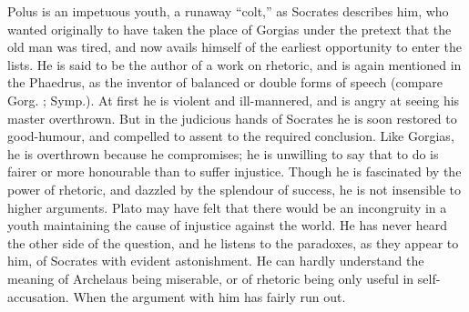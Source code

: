\documentclass[11pt,letter]{article}
\begin{document}
\par  Polus is an impetuous youth, a runaway “colt,” as Socrates describes him, who wanted originally to have taken the place of Gorgias under the pretext that the old man was tired, and now avails himself of the earliest opportunity to enter the lists. He is said to be the author of a work on rhetoric, and is again mentioned in the Phaedrus, as the inventor of balanced or double forms of speech (compare Gorg. ; Symp.). At first he is violent and ill-mannered, and is angry at seeing his master overthrown. But in the judicious hands of Socrates he is soon restored to good-humour, and compelled to assent to the required conclusion. Like Gorgias, he is overthrown because he compromises; he is unwilling to say that to do is fairer or more honourable than to suffer injustice. Though he is fascinated by the power of rhetoric, and dazzled by the splendour of success, he is not insensible to higher arguments. Plato may have felt that there would be an incongruity in a youth maintaining the cause of injustice against the world. He has never heard the other side of the question, and he listens to the paradoxes, as they appear to him, of Socrates with evident astonishment. He can hardly understand the meaning of Archelaus being miserable, or of rhetoric being only useful in self-accusation. When the argument with him has fairly run out.
\end{document}

